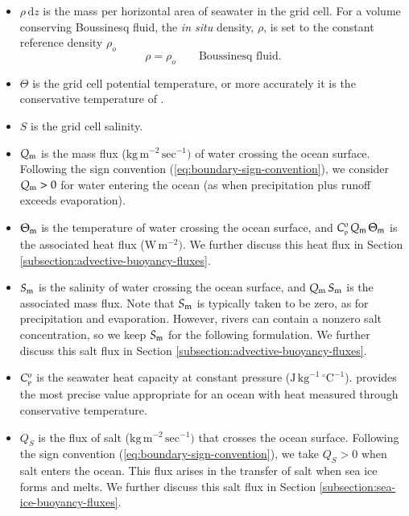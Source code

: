 \begin{itemize}

\item $\rho \, \mathrm{d}z$ is the mass per horizontal area of
  seawater in the grid cell.  For a volume conserving Boussinesq
  fluid, the {\it in situ} density, $\rho$, is set to the constant
  reference density $\rho_{o}$
\begin{equation}
  \rho = \rho_{o}  \qquad \mbox{Boussinesq fluid.}
\end{equation}

\item $\Theta$ is the grid cell potential temperature, or more
  accurately it is the conservative temperature of
  \cite{McDougall2003}.

 \item $S$ is the grid cell salinity.

 \item $Q_{\mbox{\scriptsize m}}$ is the mass flux ($\mbox{kg} \, \mbox{m}^{-2} \,
   \mbox{sec}^{-1})$ of water crossing the ocean surface.  Following
   the sign convention (\ref{eq:boundary-sign-convention}), we
   consider $Q_{\mbox{\scriptsize m}} > 0$ for water entering the ocean (as when
   precipitation plus runoff exceeds evaporation).

\item $\Theta_{\mbox{\scriptsize m}}$ is the temperature of water crossing the ocean
  surface, and $C_{\mbox{\tiny p}}^{o} \, Q_{\mbox{\scriptsize m}} \, \Theta_{\mbox{\scriptsize m}}$ is the associated heat flux
  ($\mbox{W} \, \mbox{m}^{-2})$.  We further discuss this heat flux in
  Section \ref{subsection:advective-buoyancy-fluxes}.

\item $S_{\mbox{\scriptsize m}}$ is the salinity of water crossing the ocean surface, and
  $Q_{\mbox{\scriptsize m}} \, S_{\mbox{\scriptsize m}}$ is the associated mass flux.  Note that $S_{\mbox{\scriptsize m}}$ is
  typically taken to be zero, as for precipitation and evaporation.
  However, rivers can contain a nonzero salt concentration, so we keep
  $S_{\mbox{\scriptsize m}}$ for the following formulation.  We further discuss this salt
  flux in Section \ref{subsection:advective-buoyancy-fluxes}.

\item \label{heat_capacity} $C_{\mbox{\tiny p}}^{o}$ is the seawater heat capacity at
  constant pressure ($\mbox{J} \, \mbox{kg}^{-1} \,
  \mbox{}^{\circ}\mbox{C}^{-1}$).  \cite{TEOS2010} provides the most
  precise value appropriate for an ocean with heat measured through
  conservative temperature.

\item $Q_{S}$ is the flux of salt ($\mbox{kg} \, \mbox{m}^{-2} \,
  \mbox{sec}^{-1})$ that crosses the ocean surface.  Following the
  sign convention (\ref{eq:boundary-sign-convention}), we take $Q_{S}
  > 0$ when salt enters the ocean.  This flux arises in the transfer
  of salt when sea ice forms and melts.  We further discuss this salt
  flux in Section \ref{subsection:sea-ice-buoyancy-fluxes}.


\end{itemize}
